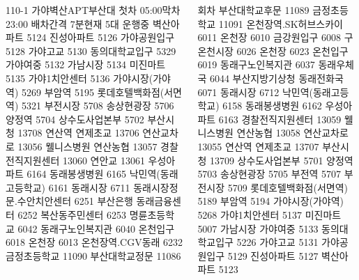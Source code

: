 \documentclass[	14pt, 
							a0paper, 
							landscape, 	%
							margin=0mm, %
							innermargin=4mm,  		%
							blockverticalspace=4mm, %
							colspace=5mm, 
							subcolspace=0mm
							]{tikzposter}
\begin{document}
\begin{columns}
		{
			\setlength{\leftmargini}{7em}			
			\setlength{\labelsep}{1em} %

110-1
가야벽산APT부산대
첫차 05:00막차 23:00
배차간격 7분현재 5대 운행중
벽산아파트
5124
진성아파트
5126
가야공원입구
5128
가야고교
5130
동의대학교입구
5329
가야여중
5132
가남시장
5134
미진마트
5135
가야1치안센터
5136
가야시장(가야역)
5269
부암역
5195
롯데호텔백화점(서면역)
5321
부전시장
5708
송상현광장
5706
양정역
5704
상수도사업본부
5702
부산시청
13708
연산역 연제초교
13706
연산교차로
13056
웰니스병원 연산농협
13057
경찰전직지원센터
13060
연안교
13061
우성아파트
6164
동래봉생병원
6165
낙민역(동래고등학교)
6161
동래시장
6711
동래시장정문.수안치안센터
6251
부산은행 동래금융센터
6252
복산동주민센터
6253
명륜초등학교
6042
동래구노인복지관
6040
온천입구
6018
온천장
6013
온천장역.CGV동래
6232
금정초등학교
11090
부산대학교정문
11086

회차
부산대학교후문
11089
금정초등학교
11091
온천장역.SK허브스카이
6011
온천장
6010
금강원입구
6008
구 온천시장
6026
온천장
6023
온천입구
6019
동래구노인복지관
6037
동래우체국
6044
부산지방기상청
동래전화국
6071
동래시장
6712
낙민역(동래고등학교)
6158
동래봉생병원
6162
우성아파트
6163
경찰전직지원센터
13059
웰니스병원 연산농협
13058
연산교차로
13055
연산역 연제초교
13707
부산시청
13709
상수도사업본부
5701
양정역
5703
송상현광장
5705
부전역
5707
부전시장
5709
롯데호텔백화점(서면역)
5189
부암역
5194
가야시장(가야역)
5268
가야1치안센터
5137
미진마트
5007
가남시장
가야여중
5133
동의대학교입구
5226
가야고교
5131
가야공원입구
5129
진성아파트
5127
벽산아파트
5123

		}



\end{columns}
\end{document}
